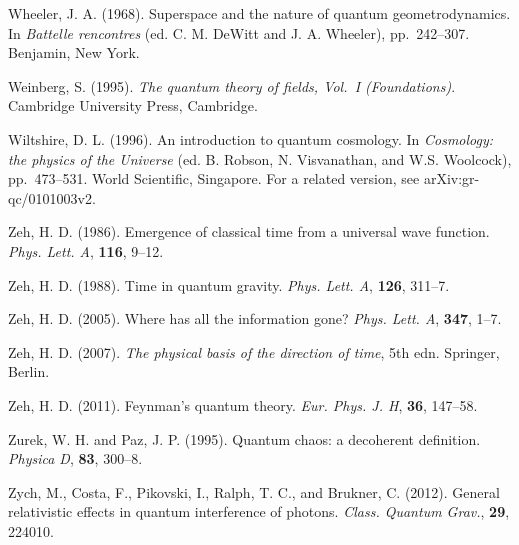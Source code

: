 \documentclass[12pt]{article}
\begin{document}
\bibitem{} Wheeler, J. A. (1968). Superspace and the nature of quantum
           geometrodynamics. In {\em Battelle rencontres} (ed. C. M.
           DeWitt and J. A. Wheeler), pp.~242--307. Benjamin, New
           York.

\bibitem{} Weinberg, S. (1995). {\em The quantum theory of fields,
           Vol.~I (Foundations)}. Cambridge University Press, Cambridge.
 
\bibitem{} Wiltshire, D. L. (1996). An introduction to quantum
  cosmology. In {\em Cosmology: the physics of the Universe}
  (ed. B. Robson, N. Visvanathan, and W.S. Woolcock), pp.~473--531.
  World Scientific, Singapore. For a related version, see
  arXiv:\-gr-qc/0101003v2.     

\bibitem{} Zeh, H. D. (1986). Emergence of classical time from a
           universal wave function. {\em Phys. Lett. A}, {\bf 116}, 9--12.  

\bibitem{} Zeh, H. D. (1988). Time in quantum gravity. {\em Phys. Lett. A},
           {\bf 126}, 311--7.

\bibitem{} Zeh, H. D. (2005). Where has all the information gone?
           {\em Phys. Lett. A}, {\bf 347}, 1--7.

\bibitem{} Zeh, H. D. (2007). {\em The physical basis of the direction
           of time}, 5th edn. Springer, Berlin.

\bibitem{} Zeh, H. D. (2011). Feynman's quantum theory.
           {\em Eur. Phys. J. H}, {\bf 36}, 147--58.

\bibitem{} Zurek, W. H. and Paz, J. P. (1995). Quantum chaos: a
  decoherent definition. {\em Physica D}, {\bf 83}, 300--8.

\bibitem{} Zych, M.,  Costa, F.,  Pikovski, I.,  Ralph, T. C., and
  Brukner, C. (2012). General relativistic effects in quantum interference of
photons. {\em Class. Quantum Grav.}, {\bf 29}, 224010.

\endthebibliography

\end{document}
